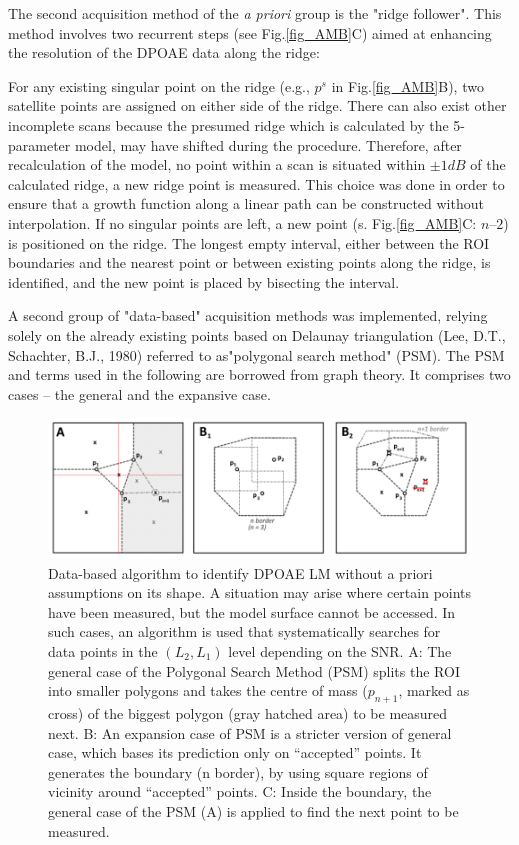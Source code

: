 \documentclass[journal,twoside,web]{ieeecolor2}
\begin{document}
The second acquisition method of the \textit{a priori} group is the "ridge follower". This method involves two recurrent steps (see Fig.\ref{fig_AMB}C) aimed at enhancing the resolution of the DPOAE data along the ridge:
\begin{algorithmic}[1]
\STATE For any existing singular point on the ridge (e.g., $p^s$ in Fig.\ref{fig_AMB}B), two satellite points are assigned on either side of the ridge. There can also exist other incomplete scans because the presumed ridge which is calculated by the 5-parameter model, may have shifted during the procedure. Therefore, after recalculation of the model, no point within a scan is situated within $\pm1 dB$ of the calculated ridge, a new ridge point is measured. This choice was done in order to ensure that a growth function along a linear path can be constructed without interpolation.
\STATE If no singular points are left, a new point (s. Fig.\ref{fig_AMB}C: $n – 2$) is positioned on the ridge. The longest empty interval, either between the ROI boundaries and the nearest point or between existing points along the ridge, is identified, and the new point is placed by bisecting the interval.
\end{algorithmic} 

A second group of "data-based" acquisition methods was implemented, relying solely on the already existing points based on Delaunay triangulation (Lee, D.T., Schachter, B.J., 1980) referred to as"polygonal search method" (PSM). The PSM and terms used in the following are borrowed from graph theory. It comprises two cases – the general and the expansive case.

\begin{figure}
\includegraphics[width=\textwidth]{Fig_ALM_DataBased} %
\caption{Data-based algorithm to identify DPOAE LM without a priori assumptions on its shape. A situation may arise where certain points have been measured, but the model surface cannot be accessed. In such cases, an algorithm is used that systematically searches for data points in the $(L_2, L_1)$ level depending on the SNR. A: The general case of the Polygonal Search Method (PSM) splits the ROI into smaller polygons and takes the centre of mass ($p_{n+1}$, marked as cross) of the biggest polygon (gray hatched area) to be measured next. B: An expansion case of PSM is a stricter version of general case, which bases its prediction only on “accepted” points. It generates the boundary (n border), by using square regions of vicinity around “accepted” points. C: Inside the boundary, the general case of the PSM (A) is applied to find the next point to be measured.}
\label{fig_ADB}
\end{figure}
\end{document}
